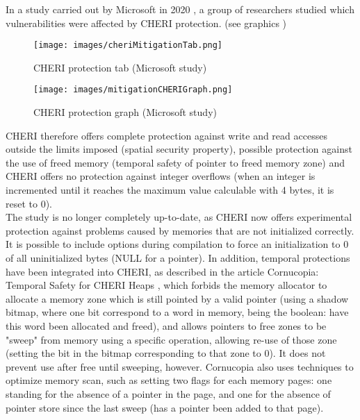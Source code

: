 \documentclass[a4paper, 11pt]{article}
\begin{document}
In a study carried out by Microsoft in 2020 \cite{joly2020security}, a group of researchers studied which vulnerabilities were affected by CHERI protection. (see graphics  )
\begin{figure}[h!]
	
	\texttt{[image: images/cheriMitigationTab.png]}
	\caption{CHERI protection tab (Microsoft study)\cite{joly2020security}}
	\label{sec:tab}
\end{figure}
\begin{figure}[h!]
	
	\texttt{[image: images/mitigationCHERIGraph.png]}
	\caption{CHERI protection graph (Microsoft study)\cite{joly2020security}}
	\label{sec:graph}
\end{figure}
CHERI therefore offers complete protection against write and read accesses outside the limits imposed (spatial security property), possible protection against the use of freed memory (temporal safety of pointer to freed memory zone) and CHERI offers no protection against integer overflows (when an integer is incremented until it reaches the maximum value calculable with 4 bytes, it is reset to 0). 
\\
The study is no longer completely up-to-date, as CHERI now offers experimental protection against problems caused by memories that are not initialized correctly. It is possible to include options during compilation to force an initialization to 0 of all uninitialized bytes (NULL for a pointer).
In addition, temporal protections have been integrated into CHERI, as described in the article Cornucopia: Temporal Safety for CHERI Heaps \cite{filardo2020cornucopia}, which forbids the memory allocator to allocate a memory zone which is still pointed by a valid pointer (using a shadow bitmap, where one bit correspond to a word in memory, being the boolean: have this word been allocated and freed), and allows pointers to free zones to be "sweep" from memory using a specific operation, allowing re-use of those zone (setting the bit in the bitmap corresponding to that zone to 0). It does not prevent use after free until sweeping, however. Cornucopia also uses techniques to optimize memory scan, such as setting two flags for each memory pages: one standing for the absence of a pointer in the page, and one for the absence of pointer store since the last sweep (has a pointer been added to that page).
\\
\end{document}
